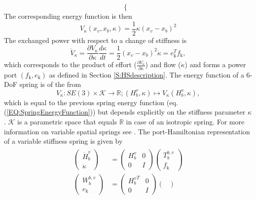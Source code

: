 \documentclass[a4paper,twoside, openright,12pt]{report}
\newcommand{\g}[1]{\text{#1}}
\begin{document}
{\begin{equation}
\begin{cases}
\end{cases}
\end{equation}
The corresponding energy function is then
\begin{equation}
V_{\kappa}(x_v,x_b,\kappa) = \frac{1}{2} \kappa (x_v-x_b)^2
\end{equation}    
The exchanged power with respect to a change of stiffness is 
\begin{equation}
\dot{V}_{\kappa} =\frac{\partial V_{\kappa}}{\partial \kappa} \frac{d \kappa}{dt} = \frac{1}{2} (x_v-x_b)^2 \dot{\kappa} = e_\g{k}^Tf_\g{k},
\end{equation}
which corresponds to the product of effort ($\frac{\partial V_{\kappa}}{\partial \kappa}$) and flow ($\dot{\kappa}$) and forms a power port $(f_\g{k},e_\g{k})$ as defined in Section \ref{S:HSdescription}. The energy function of a $6$-DoF spring is of the from
\begin{equation}
V_{\kappa}:SE(3) \times \mathcal{K} \rightarrow \mathbb{R}; (H_b^v,\kappa)\mapsto V_{\kappa}(H_b^v,\kappa),
\end{equation}
which is equal to the previous spring energy function (eq. (\ref{EQ:SpringEnergyFunction})) but depends explicitly on the stiffness parameter $\kappa$. $\mathcal{K}$ is a parametric space that equals $\mathbb{R}$ in case of an isotropic spring. For more information on variable spatial springs see \cite{Stramigioli_01c}. The port-Hamiltonian representation of a variable stiffness spring is given by
\begin{eqnarray}
\begin{aligned}
\begin{pmatrix}
\dot{H}_b^v \\ \dot{\kappa}
\end{pmatrix}
&=
\begin{pmatrix}
H_b^v & 0 \\ 0 & I
\end{pmatrix}
\begin{pmatrix}
T_b^{b,v} \\ f_\g{k}
\end{pmatrix}
\\
\begin{pmatrix}
W_b^{b,v} \\ e_\g{k}
\end{pmatrix}
&=
\begin{pmatrix}
{H_b^v}^T & 0 \\ 0 & I
\end{pmatrix}
\begin{pmatrix}

\end{pmatrix}
\end{aligned}
\end{eqnarray}}
\end{document}
